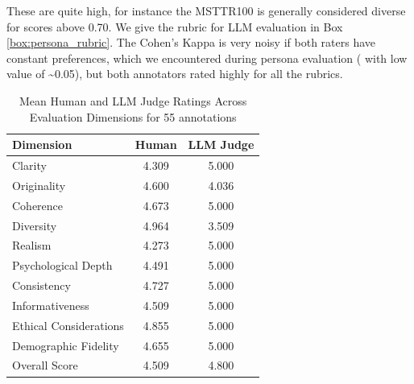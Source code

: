 \documentclass[11pt]{article}
\begin{document}
These are quite high, for instance the MSTTR100 is generally considered diverse for scores above 0.70. We give the rubric for LLM evaluation in Box \ref{box:persona_rubric}. The Cohen's Kappa is very noisy if both raters have constant preferences, which we encountered during persona evaluation ( with low value of \textasciitilde 0.05), but both annotators rated highly for all the rubrics. 

\begin{table}[H]
\label{tab:avg_rating_llm_human}
\centering
\caption{Mean Human and LLM Judge Ratings Across Evaluation Dimensions for 55 annotations}
\begin{tabularx}{\columnwidth}{|X|c|c|}
\hline
\textbf{Dimension} & \textbf{Human} & \textbf{LLM Judge} \\
\hline
Clarity & 4.309 & 5.000 \\
\hline
Originality & 4.600 & 4.036 \\
\hline
Coherence & 4.673 & 5.000 \\
\hline
Diversity & 4.964 & 3.509 \\
\hline
Realism & 4.273 & 5.000 \\
\hline
Psychological Depth & 4.491 & 5.000 \\
\hline
Consistency & 4.727 & 5.000 \\
\hline
Informativeness & 4.509 & 5.000 \\
\hline
Ethical Considerations & 4.855 & 5.000 \\
\hline
Demographic Fidelity & 4.655 & 5.000 \\
\hline
Overall Score & 4.509 & 4.800 \\
\hline
\end{tabularx}
\end{table}
\end{document}
